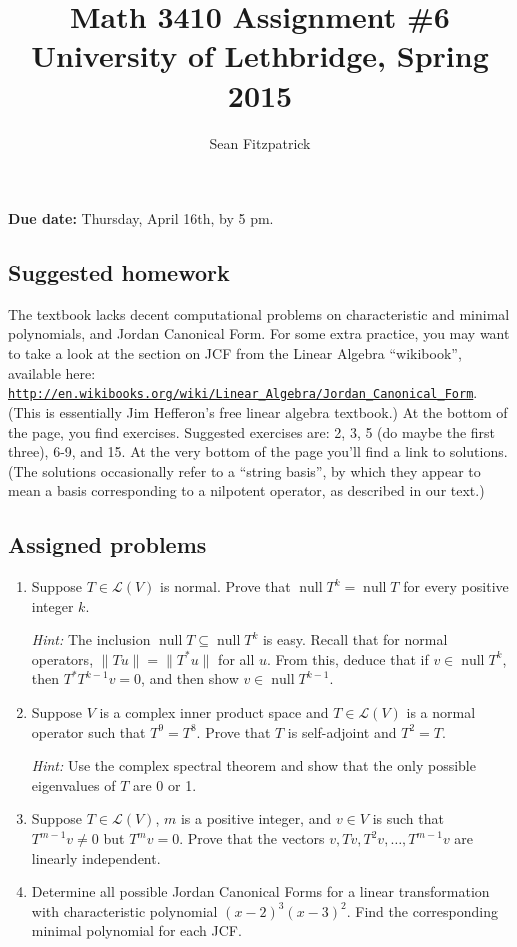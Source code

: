 \documentclass[letterpaper,12pt]{article}
\title{Math 3410 Assignment \#6\\University of Lethbridge, Spring 2015}
\author{Sean Fitzpatrick}
\renewcommand{\L}{\mathcal{L}}
\newcommand{\len}[1]{\lVert #1\rVert}
\DeclareMathOperator{\nul}{null}
\begin{document}
 \maketitle

{\bf Due date:} Thursday, April 16th, by 5 pm.

\bigskip


\subsection*{Suggested homework}
The textbook lacks decent computational problems on characteristic and minimal polynomials, and Jordan Canonical Form. For some extra practice, you may want to take a look at the section on JCF from the Linear Algebra ``wikibook'', available here: \href{http://en.wikibooks.org/wiki/Linear_Algebra/Jordan_Canonical_Form}{\nolinkurl{http://en.wikibooks.org/wiki/Linear_Algebra/Jordan_Canonical_Form}}. (This is essentially Jim Hefferon's free linear algebra textbook.) At the bottom of the page, you find exercises. Suggested exercises are:
2, 3, 5 (do maybe the first three), 6-9, and 15. At the very bottom of the page you'll find a link to solutions. (The solutions occasionally refer to a ``string basis'', by which they appear to mean a basis corresponding to a nilpotent operator, as described in our text.)
\subsection*{Assigned problems}
\begin{enumerate}
\item Suppose $T\in\L(V)$ is normal. Prove that $\nul T^k=\nul T$ for every positive integer $k$.

{\em Hint:} The inclusion $\nul T\subseteq \nul T^k$ is easy. Recall that for normal operators, $\len{Tu}=\len{T^*u}$ for all $u$. From this, deduce that if $v\in \nul T^k$, then $T^*T^{k-1}v=0$, and then show $v\in \nul T^{k-1}$.

\item Suppose $V$ is a complex inner product space and $T\in\L(V)$ is a normal operator such that $T^9=T^8$. Prove that $T$ is self-adjoint and $T^2=T$.

{\em Hint:} Use the complex spectral theorem and show that the only possible eigenvalues of $T$ are 0 or 1.

\item Suppose $T\in \L(V)$, $m$ is a positive integer, and $v\in V$ is such that $T^{m-1}v\neq 0$ but $T^mv=0$. Prove that the vectors $v, Tv, T^2v,\ldots, T^{m-1}v$ are linearly independent.

\item Determine all possible Jordan Canonical Forms for a linear transformation with characteristic polynomial $(x-2)^3(x-3)^2$. Find the corresponding minimal polynomial for each JCF.
\end{enumerate}
\end{document}
